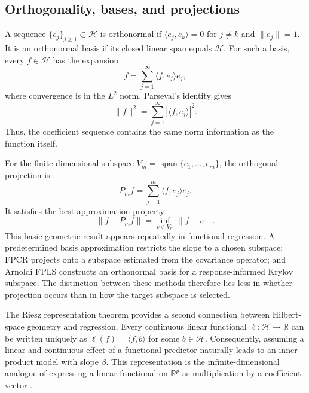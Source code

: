 \subsection{Orthogonality, bases, and projections}

A sequence $\{e_j\}_{j\geq1}\subset\mathcal H$ is orthonormal if $\langle e_j,e_k\rangle=0$ for $j\neq k$ and $\|e_j\|=1$. It is an orthonormal basis if its closed linear span equals $\mathcal H$. For such a basis, every $f\in\mathcal H$ has the expansion
\begin{equation}
    f=\sum_{j=1}^{\infty}\langle f,e_j\rangle e_j,
    \label{eq:hilbert-basis-expansion}
\end{equation}
where convergence is in the $L^2$ norm. Parseval's identity gives
\begin{equation}
    \|f\|^2=\sum_{j=1}^{\infty}|\langle f,e_j\rangle|^2.
    \label{eq:parseval}
\end{equation}
Thus, the coefficient sequence contains the same norm information as the function itself.

For the finite-dimensional subspace $V_m=\operatorname{span}\{e_1,\ldots,e_m\}$, the orthogonal projection is
\begin{equation}
    P_m f=\sum_{j=1}^{m}\langle f,e_j\rangle e_j.
    \label{eq:orthogonal-projection}
\end{equation}
It satisfies the best-approximation property
\begin{equation}
    \|f-P_m f\|
    =\inf_{v\in V_m}\|f-v\|.
    \label{eq:best-approximation}
\end{equation}
This basic geometric result appears repeatedly in functional regression. A predetermined basis approximation restricts the slope to a chosen subspace; FPCR projects onto a subspace estimated from the covariance operator; and Arnoldi FPLS constructs an orthonormal basis for a response-informed Krylov subspace. The distinction between these methods therefore lies less in whether projection occurs than in how the target subspace is selected.

The Riesz representation theorem provides a second connection between Hilbert-space geometry and regression. Every continuous linear functional $\ell:\mathcal H\rightarrow\mathbb R$ can be written uniquely as $\ell(f)=\langle f,b\rangle$ for some $b\in\mathcal H$. Consequently, assuming a linear and continuous effect of a functional predictor naturally leads to an inner-product model with slope $\beta$. This representation is the infinite-dimensional analogue of expressing a linear functional on $\mathbb R^p$ as multiplication by a coefficient vector \parencite{lin_mit_18102_2021,hsing_eubank_2015}.

